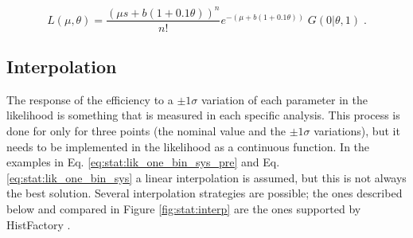 \begin{equation}
\label{eq:stat:lik_one_bin_sys}
L(\mu, \theta) =
\frac{ (\mu s +
b(1 + 0.1\theta) )^{n} }{ n! }
e^{- (\mu  + b (1 + 0.1\theta) )}   \;
G( 0 | \theta, 1) \; .
\end{equation}

\subsection*{Interpolation}

The response of the efficiency to a $\pm 1 \sigma$ variation of each parameter in the likelihood is something that is measured in each specific analysis. This process is done for only for three points (the nominal value and the $\pm 1 \sigma$ variations), but it needs to be implemented in the likelihood as a continuous function. In the examples in Eq. \ref{eq:stat:lik_one_bin_sys_pre} and Eq. \ref{eq:stat:lik_one_bin_sys} a linear interpolation is assumed, but this is not always the best solution. 
Several interpolation strategies are possible; the ones described below and compared in Figure \ref{fig:stat:interp} are the ones supported by HistFactory \cite{Cranmer:1456844}.
 


